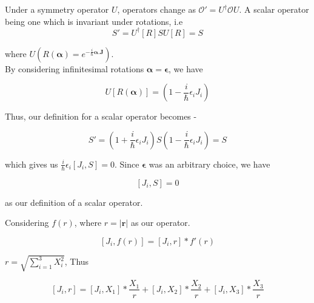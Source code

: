 



Under a symmetry operator $U$, operators change as $\mathcal{O}' = U^{\dagger}\mathcal{O}U$. A scalar operator being one which is invariant under rotations, i.e
\begin{equation*}
    S' = U^{\dagger}[R]SU[R] = S
\end{equation*}

where $U(R(\boldsymbol{\alpha}) = e^{-\frac{i}{\hbar}\boldsymbol{\alpha}.\mathbf{J}})$. \\
By considering infinitesimal rotations $\boldsymbol{\alpha} = \boldsymbol{\epsilon}$, we have 

\begin{equation*}
    U[R(\boldsymbol{\alpha})] = \left( 1 - \frac{i}{\hbar}\epsilon_{i}J_{i}\right)
\end{equation*}

Thus, our definition for a scalar operator becomes - 

\begin{equation*}
    S' = \left( 1 + \frac{i}{\hbar}\epsilon_{i}J_{i}\right)S\left( 1 - \frac{i}{\hbar}\epsilon_{i}J_{i}\right) = S
\end{equation*}

which gives us $\frac{i}{\hbar}\epsilon_{i}\left[ J_{i},S \right] = 0$. Since $\boldsymbol{\epsilon}$ was an arbitrary choice, we have 

\begin{equation*}
    \left[ J_{i},S \right] = 0
\end{equation*}

as our definition of a scalar operator.

Considering $f(r)$, where $r = |\mathbf{r}|$ as our operator.

\begin{equation*}
    \left[ J_{i},f(r) \right] = \left[ J_{i},r \right]*f'(r)
\end{equation*}

$r = \sqrt{\sum_{i=1}^{3}X_{i}^{2}}$, Thus

\begin{equation*}
    \left[ J_{i},r \right] = \left[ J_{i},X_{1} \right]*\frac{X_{1}}{r} + \left[ J_{i},X_{2} \right]*\frac{X_{2}}{r} + \left[ J_{i},X_{3} \right]*\frac{X_{3}}{r}
\end{equation*}

